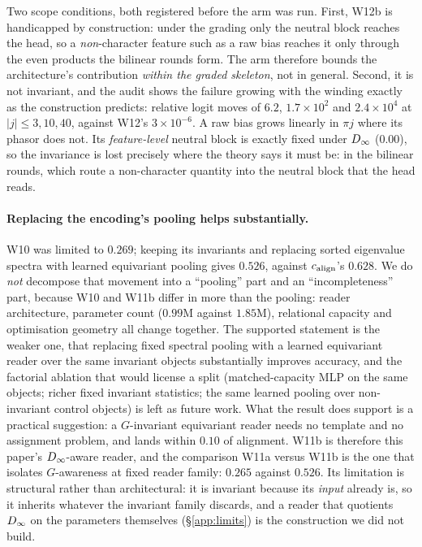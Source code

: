 Two scope conditions, both registered before the arm was run. First, W12b is handicapped by
construction: under the grading only the neutral block reaches the head, so a \emph{non}-character
feature such as a raw bias reaches it only through the even products the bilinear rounds form. The
arm therefore bounds the architecture's contribution \emph{within the graded skeleton}, not in
general. Second, it is not invariant, and the audit shows the failure growing with the winding exactly as
the construction predicts: relative logit moves of $6.2$, $1.7\times10^2$ and $2.4\times10^4$ at
$|j| \le 3, 10, 40$, against W12's $3\times10^{-6}$. A raw bias grows linearly in $\pi j$ where its
phasor does not. Its \emph{feature-level} neutral block is exactly
fixed under $D_\infty$ ($0.00$), so the invariance is lost precisely where the theory says it must be:
in the bilinear rounds, which route a non-character quantity into the neutral block that the head
reads.

\paragraph{Replacing the encoding's pooling helps substantially.} W10 was limited to $0.269$;
keeping its invariants and replacing sorted eigenvalue spectra with learned equivariant pooling
gives $0.526$, against $c_{\mathrm{align}}$'s $0.628$. We do \emph{not} decompose that movement into a
``pooling'' part and an ``incompleteness'' part, because W10 and W11b differ in more than the
pooling: reader architecture, parameter count ($0.99$M against $1.85$M), relational capacity and
optimisation geometry all change together. The supported statement is the weaker one, that replacing
fixed spectral pooling with a learned equivariant reader over the same invariant objects
substantially improves accuracy, and the factorial ablation that would license a split
(matched-capacity MLP on the same objects; richer fixed invariant statistics; the same learned
pooling over non-invariant control objects) is left as future work. What the result does support is
a practical suggestion: a $G$-invariant equivariant reader needs no template and no assignment
problem, and lands within $0.10$ of alignment. W11b is therefore this paper's $D_\infty$-aware reader,
and the comparison W11a versus W11b is the one that isolates $G$-awareness at fixed reader family: $0.265$ against $0.526$. Its limitation is structural rather than architectural: it is invariant
because its \emph{input} already is, so it inherits whatever the invariant family discards, and a
reader that quotients $D_\infty$ on the parameters themselves (\S\ref{app:limits}) is the construction
we did not build.

